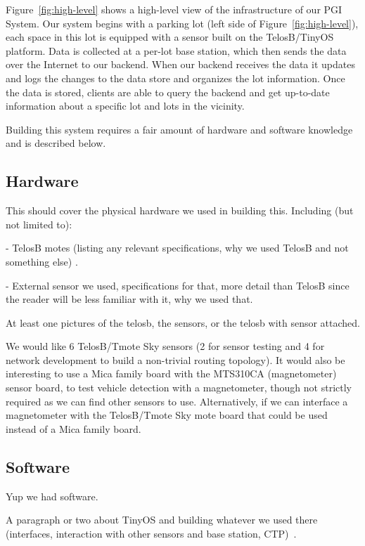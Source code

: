 \documentclass{acm_proc}
\begin{document}
Figure~\ref{fig:high-level} shows a high-level view of the infrastructure
of our PGI System.
Our system begins with a parking lot (left side of
Figure~\ref{fig:high-level}), each space in this lot is equipped with a
sensor built on the TelosB/TinyOS platform.
Data is collected at a per-lot base station, which then sends the data over
the Internet to our backend.
When our backend receives the data it updates and logs the changes to the
data store and organizes the lot information.
Once the data is stored, clients are able to query the backend and get
up-to-date information about a specific lot and lots in the vicinity.

Building this system requires a fair amount of hardware and software
knowledge and is described below.

\subsection{Hardware}

This should cover the physical hardware we used in building this.
Including (but not limited to):

- TelosB motes (listing any relevant specifications, why we used TelosB
 and not something else) \cite{xbow:telosb-datasheet}.

- External sensor we used, specifications for that, more detail than
 TelosB since the reader will be less familiar with it, why we used that.

At least one pictures of the telosb, the sensors, or the telosb with sensor
attached.

We would like 6 TelosB/Tmote Sky sensors (2 for sensor testing and 4 for
network
development to build a non-trivial routing topology).
It would also be interesting to use a Mica family board with the MTS310CA
(magnetometer) sensor board, to test vehicle detection with a magnetometer,
though not strictly required as we can find other sensors to use.
Alternatively, if we can interface a magnetometer with the TelosB/Tmote Sky
mote board that could be used instead of a Mica family board.

\subsection{Software}

Yup we had software.

A paragraph or two about TinyOS and building whatever we used there
(interfaces, interaction with other sensors and base
station, CTP)~\cite{tep119:collection}.
\end{document}
